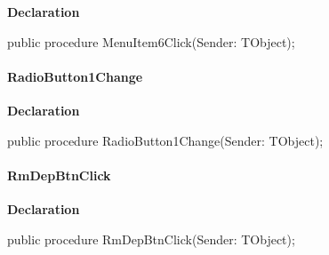 \documentclass{report}
\newif\ifpdf
\begin{document}
\label{prjwizard.TfrmProjectWizard-MenuItem6Click}
\begin{list}{}{
\setlength{\itemindent}{0cm}
\setlength{\listparindent}{0cm}
\setlength{\leftmargin}{\evensidemargin}
\addtolength{\leftmargin}{\tmplength}
\settowidth{\labelsep}{X}
\addtolength{\leftmargin}{\labelsep}
\setlength{\labelwidth}{\tmplength}
}
\item[\textbf{Declaration}\hfill]
\ifpdf
\begin{flushleft}
\fi
\begin{ttfamily}
public procedure MenuItem6Click(Sender: TObject);\end{ttfamily}

\ifpdf
\end{flushleft}
\fi

\end{list}
\paragraph*{RadioButton1Change}\hspace*{\fill}

\label{prjwizard.TfrmProjectWizard-RadioButton1Change}
\begin{list}{}{
\setlength{\itemindent}{0cm}
\setlength{\listparindent}{0cm}
\setlength{\leftmargin}{\evensidemargin}
\addtolength{\leftmargin}{\tmplength}
\settowidth{\labelsep}{X}
\addtolength{\leftmargin}{\labelsep}
\setlength{\labelwidth}{\tmplength}
}
\item[\textbf{Declaration}\hfill]
\ifpdf
\begin{flushleft}
\fi
\begin{ttfamily}
public procedure RadioButton1Change(Sender: TObject);\end{ttfamily}

\ifpdf
\end{flushleft}
\fi

\end{list}
\paragraph*{RmDepBtnClick}\hspace*{\fill}

\label{prjwizard.TfrmProjectWizard-RmDepBtnClick}
\begin{list}{}{
\setlength{\itemindent}{0cm}
\setlength{\listparindent}{0cm}
\setlength{\leftmargin}{\evensidemargin}
\addtolength{\leftmargin}{\tmplength}
\settowidth{\labelsep}{X}
\addtolength{\leftmargin}{\labelsep}
\setlength{\labelwidth}{\tmplength}
}
\item[\textbf{Declaration}\hfill]
\ifpdf
\begin{flushleft}
\fi
\begin{ttfamily}
public procedure RmDepBtnClick(Sender: TObject);\end{ttfamily}

\ifpdf
\end{flushleft}
\fi

\end{list}
\end{document}
